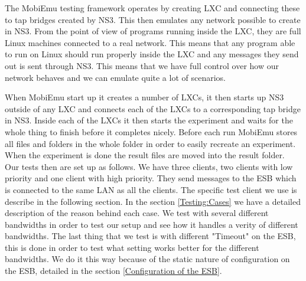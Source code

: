     The MobiEmu testing framework operates by creating LXC and connecting these to tap bridges created by NS3. This then emulates any network possible to create in NS3. From the point of view of programs running inside the LXC, they are full Linux machines connected to a real network. This means that any program able to run on Linux should run properly inside the LXC and any messages they send out is sent through NS3. This means that we have full control over how our network behaves and we can emulate quite a lot of scenarios.
    
    When MobiEmu start up it creates a number of LXCs, it then starts up NS3 outside of any LXC and connects each of the LXCs to a corresponding tap bridge in NS3. Inside each of the LXCs it then starts the experiment and waits for the whole thing to finish before it completes nicely. Before each run MobiEmu stores all files and folders in the whole folder in order to easily recreate an experiment. When the experiment is done the result files are moved into the result folder. \\
    
    Our tests then are set up as follows. We have three clients, two clients with low priority and one client with high priority. They send messages to the ESB which is connected to the same LAN as all the clients. The specific test client we use is describe in the following section. In the section \ref{Testing:Cases} we have a detailed description of the reason behind each case. We test with several different bandwidths in order to test our setup and see how it handles a verity of different bandwidths. The last thing that we test is with different "Timeout" on the ESB, this is done in order to test what setting works better for the different bandwidths. We do it this way because of the static nature of configuration on the ESB, detailed in the section \ref{Configuration of the ESB}.
